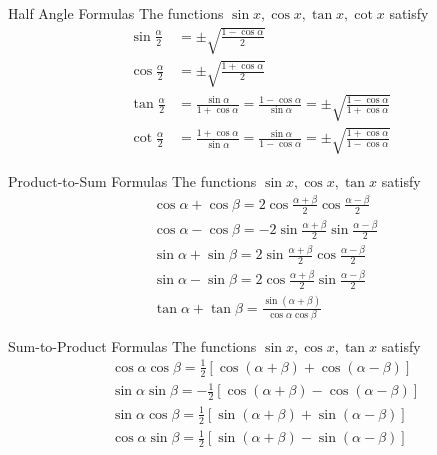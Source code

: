 \begin{proposition}{Half Angle Formulas}{}
  The functions $\sin x, \cos x, \tan x, \cot x$ satisfy
  \begin{align}
    \sin \frac{\alpha}{2} &=\pm \sqrt{\frac{1-\cos \alpha}{2}} \\
    \cos \frac{\alpha}{2} &=\pm \sqrt{\frac{1+\cos \alpha}{2}} \\
    \tan \frac{\alpha}{2} &=\frac{\sin \alpha}{1+\cos \alpha}=\frac{1-\cos \alpha}{\sin \alpha}=\pm \sqrt{\frac{1-\cos \alpha}{1+\cos \alpha}} \\
    \cot \frac{\alpha}{2} &=\frac{1+\cos \alpha}{\sin \alpha}=\frac{\sin \alpha}{1-\cos \alpha}=\pm \sqrt{\frac{1+\cos \alpha}{1-\cos \alpha}}
  \end{align}
\end{proposition}

\begin{proposition}{Product-to-Sum Formulas}{}
  The functions $\sin x, \cos x, \tan x$ satisfy
  \begin{align}
    &\cos \alpha+\cos \beta=2 \cos \frac{\alpha+\beta}{2} \cos \frac{\alpha-\beta}{2} \\
    &\cos \alpha-\cos \beta=-2 \sin \frac{\alpha+\beta}{2} \sin \frac{\alpha-\beta}{2} \\
    &\sin \alpha+\sin \beta=2 \sin \frac{\alpha+\beta}{2} \cos \frac{\alpha-\beta}{2} \\
    &\sin \alpha-\sin \beta=2 \cos \frac{\alpha+\beta}{2} \sin \frac{\alpha-\beta}{2} \\
    &\tan \alpha+\tan \beta=\frac{\sin (\alpha+\beta)}{\cos \alpha \cos \beta}
  \end{align}
\end{proposition}

\begin{proposition}{Sum-to-Product Formulas}{}
  The functions $\sin x, \cos x, \tan x$ satisfy
  \begin{align}
    &\cos \alpha \cos \beta=\frac{1}{2}[\cos (\alpha+\beta)+\cos (\alpha-\beta)] \\
    &\sin \alpha \sin \beta=-\frac{1}{2}[\cos (\alpha+\beta)-\cos (\alpha-\beta)]\\
    &\sin \alpha \cos \beta=\frac{1}{2}[\sin (\alpha+\beta)+\sin (\alpha-\beta)] \\
    &\cos \alpha \sin \beta=\frac{1}{2}[\sin (\alpha+\beta)-\sin (\alpha-\beta)] 
  \end{align}
\end{proposition}

